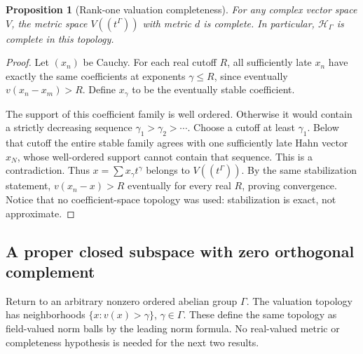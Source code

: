 \documentclass[11pt,a4paper]{article}
\numberwithin{equation}{section}
\newtheorem{proposition}[proposition]{Proposition}
\theoremstyle{definition}
\theoremstyle{remark}
\newcommand{\Hil}{\mathcal H_\Gamma}
\begin{document}
\begin{proposition}[Rank-one valuation completeness]\label{ihs:hh:prop:complete}
For any complex vector space $V$, the metric space $V((t^\Gamma))$ with
metric $d$ is complete. In particular, $\Hil$ is complete in this topology.
\end{proposition}
\begin{proof}
Let $(x_n)$ be Cauchy. For each real cutoff $R$, all sufficiently late $x_n$
have exactly the same coefficients at exponents $\gamma\le R$, since
eventually $v(x_n-x_m)>R$. Define $x_\gamma$ to be the eventually stable
coefficient.

The support of this coefficient family is well ordered. Otherwise it would
contain a strictly decreasing sequence $\gamma_1>\gamma_2>\cdots$. Choose a
cutoff at least $\gamma_1$. Below that cutoff the entire stable family
agrees with one sufficiently late Hahn vector $x_N$, whose well-ordered
support cannot contain that sequence. This is a contradiction. Thus
$x=\sum x_\gamma t^\gamma$ belongs to $V((t^\Gamma))$. By the same
stabilization statement, $v(x_n-x)>R$ eventually for every real $R$, proving
convergence. Notice that no coefficient-space topology was used:
stabilization is exact, not approximate.
\end{proof}

\subsection{A proper closed subspace with zero orthogonal complement}\label{ihs:hh:sec:closedrange}
Return to an arbitrary nonzero ordered abelian group $\Gamma$. The valuation
topology has neighborhoods $\{x:v(x)>\gamma\}$, $\gamma\in\Gamma$.
These define the same topology as field-valued norm balls by the leading
norm formula. No real-valued metric or completeness hypothesis is needed
for the next two results.
\end{document}
